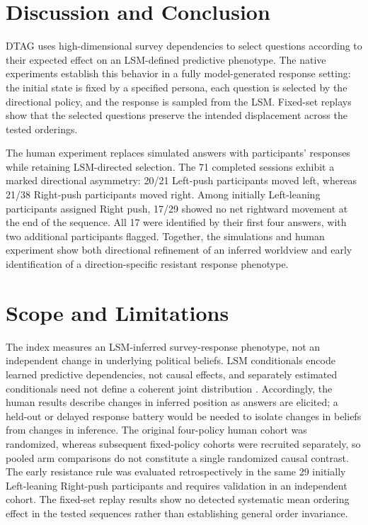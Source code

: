 \documentclass[technote,10pt]{IEEEtran}
\begin{document}



\section{Discussion and Conclusion}
DTAG uses high-dimensional survey dependencies to select questions
according to their expected effect on an LSM-defined predictive phenotype.
The native experiments establish this behavior in a fully model-generated
response setting: the initial state is fixed by a specified persona, each
question is selected by the directional policy, and the response is sampled
from the LSM. Fixed-set replays show that the selected questions preserve
the intended displacement across the tested orderings.

The human experiment replaces simulated answers with participants'
responses while retaining LSM-directed selection. The 71 completed
sessions exhibit a marked directional asymmetry: 20/21 Left-push
participants moved left, whereas 21/38 Right-push participants moved
right. Among initially Left-leaning participants assigned Right push,
17/29 showed no net rightward movement at the end of the sequence.
All 17 were identified by their first four answers, with two additional
participants flagged. Together, the simulations and human experiment
show both directional refinement of an inferred worldview and early
identification of a direction-specific resistant response phenotype.

\section{Scope and Limitations}
The index measures an LSM-inferred survey-response phenotype, not an
independent change in underlying political beliefs. LSM conditionals
encode learned predictive dependencies, not causal effects, and
separately estimated conditionals need not define a coherent joint
distribution \cite{heckerman2000}. Accordingly, the human results
describe changes in inferred position as answers are elicited; a
held-out or delayed response battery would be needed to isolate
changes in beliefs from changes in inference. The original four-policy
human cohort was randomized, whereas subsequent fixed-policy cohorts
were recruited separately, so pooled arm comparisons do not constitute
a single randomized causal contrast. The early resistance rule was
evaluated retrospectively in the same 29 initially Left-leaning
Right-push participants and requires validation in an independent cohort.
The fixed-set replay results show no detected systematic mean ordering
effect in the tested sequences rather than establishing general order
invariance.
\end{document}
